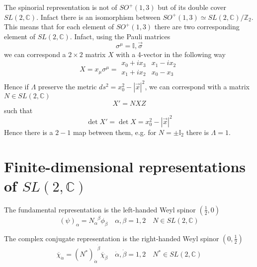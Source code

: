     The spinorial representation is not of $SO^+(1,3)$ but of its double cover $SL(2, \mathbb C)$. Infact there is an isomorphism between $SO^+(1,3) \simeq SL(2, \mathbb C) / \mathbb Z_2$. This means that for each element of $SO^+(1,3)$ there are two corresponding element of $SL(2, \mathbb C)$. Infact, using the Pauli matrices 
    \begin{equation*}
        \sigma^\mu = {\mathbb I, \vec \sigma}
    \end{equation*}
    we can correspond a $2 \times 2$ matrix $X$ with a 4-vector in the following way 
    \begin{equation*}
        X = x_\mu \sigma^\mu = \begin{matrix}
            x_0 + i x_3 & x_1 - i x_2 \\
            x_1 + i x_2 & x_0 - x_3 \\
        \end{matrix}
    \end{equation*}
    Hence if $\Lambda$ preserve the metric $ds^2 = x^2_0 - |\vec x|^2$, we can correspond with a matrix $N \in SL(2, \mathbb C)$
    \begin{equation*}
        X' = N X Z
    \end{equation*}
    such that 
    \begin{equation*}
        \det X' = \det X = x^2_0 - |\vec x|^2
    \end{equation*}
    Hence there is a $2-1$ map between them, e.g. for $N = \pm \mathbb I_2$ there is $\Lambda = 1$. 

\section{Finite-dimensional representations of $SL(2, \mathbb C)$}

    The fundamental representation is the left-handed Weyl spinor $(\frac{1}{2}, 0)$ 
    \begin{equation*}
        (\psi)_\alpha = N_\alpha^{\phantom \alpha \beta} \phi_\beta \quad \alpha, \beta = 1,2 \quad N \in SL(2, \mathbb C)
    \end{equation*}

    The complex conjugate representation is the right-handed Weyl spinor $(0, \frac{1}{2})$ 
    \begin{equation*}
        \overline \chi_{\dot \alpha} = (N^*)_{\dot \alpha}^{\phantom{\dot \alpha} \dot \beta} \overline \chi_{\dot \beta} \quad \dot \alpha, \dot \beta = 1,2 \quad N^* \in SL(2, \mathbb C)
    \end{equation*}

